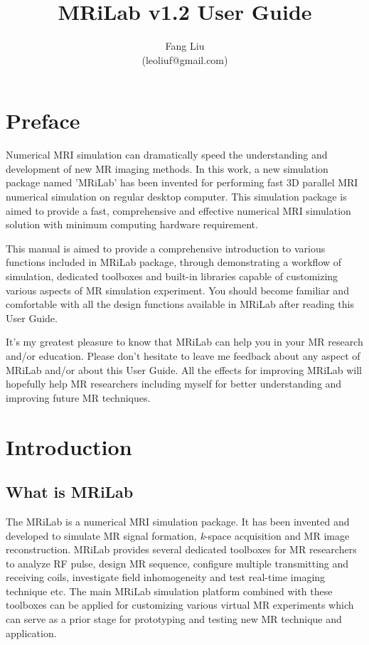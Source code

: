 \documentclass{book}%
\begin{document}
\frontmatter
\title{MRiLab v1.2 User Guide}
\author{Fang Liu \\ (leoliuf@gmail.com)}
\maketitle
\tableofcontents
\chapter*{Preface}

Numerical MRI simulation can dramatically speed the understanding and development of new MR imaging methods. In this work, a new simulation package named 'MRiLab' has been invented for performing fast 3D parallel MRI numerical simulation on regular desktop computer. This simulation package is aimed to provide a fast, comprehensive and effective numerical MRI simulation solution with minimum computing hardware requirement.

This manual is aimed to provide a comprehensive introduction to various functions included in MRiLab package, through demonstrating a workflow of simulation, dedicated toolboxes and built-in libraries capable of customizing various aspects of MR simulation experiment. You should become familiar and comfortable with all the design functions available in MRiLab after reading this User Guide.

It's my greatest pleasure to know that MRiLab can help you in your MR research and/or education. Please don't hesitate to leave me feedback about any aspect of MRiLab and/or about this User Guide. All the effects for improving MRiLab will hopefully help MR researchers including myself for better understanding and improving future MR techniques.

\mainmatter

\chapter{Introduction}
\section{What is MRiLab}
The MRiLab is a numerical MRI simulation package. It has been invented and developed to simulate MR signal formation, \textit{k}-space acquisition and MR image reconstruction. MRiLab provides several dedicated toolboxes for MR researchers to analyze RF pulse, design MR sequence, configure multiple transmitting and receiving coils, investigate field inhomogeneity and test real-time imaging technique etc. The main MRiLab simulation platform combined with these toolboxes can be applied for customizing various virtual MR experiments which can serve as a prior stage for prototyping and testing new MR technique and application.
\end{document}
